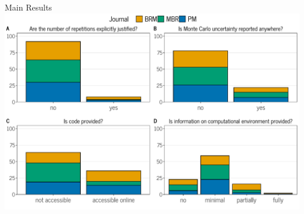 \documentclass[english, 12pt, aspectratio=169]{beamer}
\begin{document}
\begin{frame}{Main Results}
\pause
   \includegraphics{pics/review-results.pdf}
\end{frame}


% 
% 
% 
\end{document}
